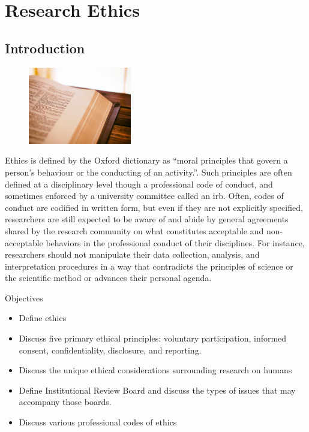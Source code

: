 \chapter{Research Ethics}\label{03:ethics}

\section{Introduction}

\begin{figure}
	\label{03:fig01} 
	\centering
	\includegraphics[width=0.4\textwidth]{gfx/03-book} 
\end{figure}

Ethics is defined by the Oxford dictionary as ``moral principles that govern a person's behaviour or the conducting of an activity.''\cite{oxford2018ethics}. Such principles are often defined at a disciplinary level though a professional code of conduct, and sometimes enforced by a university committee called an \gls{irb}. Often, codes of conduct are codified in written form, but even if they are not explicitly specified, researchers are still expected to be aware of and abide by general agreements shared by the research community on what constitutes acceptable and non-acceptable behaviors in the professional conduct of their disciplines. For instance, researchers should not manipulate their data collection, analysis, and interpretation procedures in a way that contradicts the principles of science or the scientific method or advances their personal agenda.

\begin{center}
	\begin{objbox}{Objectives}
		\begin{itemize}
			\setlength{\itemsep}{0pt}
			\setlength{\parskip}{0pt}
			\setlength{\parsep}{0pt}
			
			\item Define ethics
			\item Discuss five primary ethical principles: voluntary participation, informed consent, confidentiality, disclosure, and reporting.
			\item Discuss the unique ethical considerations surrounding research on humans
			\item Define Institutional Review Board and discuss the types of issues that may accompany those boards.			
			\item Discuss various professional codes of ethics
		\end{itemize}
	\end{objbox}
\end{center}

